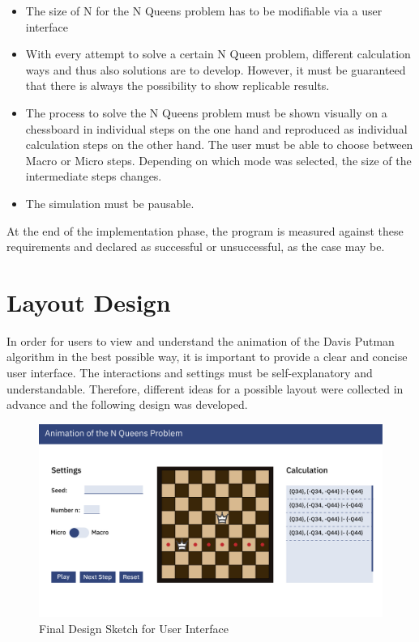 \begin{itemize}
  \item The size of N for the N Queens problem has to be modifiable via a user interface
  \item With every attempt to solve a certain N Queen problem, different calculation ways and thus also solutions are to develop. However, it must be guaranteed that there is always the possibility to show replicable results. 
  \item The process to solve the N Queens problem must be shown visually on a chessboard in individual steps on the one hand and reproduced as individual calculation steps on the other hand. The user must be able to choose between Macro or Micro steps. Depending on which mode was selected, the size of the intermediate steps changes.
  \item The simulation must be pausable.
\end{itemize}

At the end of the implementation phase, the program is measured against these requirements and declared as successful or unsuccessful, as the case may be. 

\section{Layout Design}
\label{sec:conDesign}
In order for users to view and understand the animation of the Davis Putman algorithm in the best possible way, it is important to provide a clear and concise user interface. The interactions and settings must be self-explanatory and understandable. Therefore, different ideas for a possible layout were collected in advance and the following design was developed. 

\begin{figure}[h]
  \centering
  \includegraphics[width=\textwidth]{img/Design_N_Queens}
  \caption{Final Design Sketch for User Interface}
  \label{fig:design}
\end{figure}

